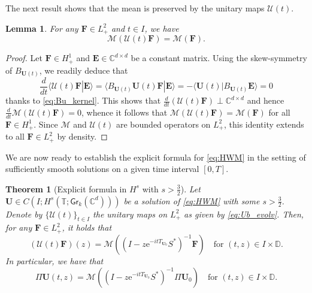 \documentclass[10pt,reqno,a4paper]{amsart}
\newtheorem{lem}{Lemma}[section]
\newtheorem{thm}{Theorem}[section]
\theoremstyle{definition}
\theoremstyle{remark}
\theoremstyle{remark}
\numberwithin{equation}{section}
\newcommand{\C}{\mathbb{C}}
\newcommand{\T}{\mathbb{T}}
\newcommand{\D}{\mathbb{D}}
\newcommand{\Mean}{\mathscr{M}}
\newcommand{\Cd}{\mathbb{C}^{d \times d}}
\newcommand{\eu}{\mathrm{e}}
\newcommand{\Ub}{\mathbf{U}}
\newcommand{\Fb}{\mathbf{F}}
\newcommand{\Eb}{\mathbf{E}}
\newcommand{\id}{I}
\newcommand{\Gr}{\mathsf{Gr}}
\newcommand{\Us}{\mathscr{U}}
\begin{document}
The next result shows that the mean is preserved by the unitary maps $\Us(t)$.

\begin{lem} \label{lem:Us_mean}
For any $\Fb \in L^2_+$ and $t \in I$, we have
$$
\Mean(\Us(t) \Fb) = \Mean(\Fb).
$$
\end{lem}

\begin{proof}
Let $\Fb \in H^1_+$ and $\Eb \in \C^{d \times d}$ be a constant matrix. Using the skew-symmetry of $B_{\Ub(t)}$, we readily deduce that 
$$
\frac{d}{dt} \langle \Us(t) \Fb | \Eb \rangle = \langle B_{\Ub(t)} \Ub(t) \Fb | \Eb \rangle = -\langle \Ub(t) | B_{\Ub(t)} \Eb \rangle = 0
$$
thanks to \eqref{eq:Bu_kernel}. This shows that $\frac{d}{dt} ( \Us(t) \Fb) \perp \Cd$ and hence $\frac{d}{dt} \Mean(\Us(t) \Fb)=0$, whence it follows that $\Mean(\Us(t) \Fb) = \Mean(\Fb)$ for all $\Fb \in H^1_+$. Since $\Mean$ and $\Us(t)$ are bounded operators on $L^2_+$, this identity extends to all $\Fb \in L^2_+$ by density.
\end{proof}


We are now ready to establish the explicit formula for \eqref{eq:HWM} in the setting of sufficiently smooth solutions on a given time interval $[0,T]$.

\begin{thm}[Explicit formula in $H^s$ with $s > \frac{3}{2}$] \label{thm:explicit_smooth}
Let $\Ub \in C(I; H^s(\T;\Gr_k(\C^d)))$ be a solution of \eqref{eq:HWM} with some $s > \frac{3}{2}$. Denote by $\{ \Us(t) \}_{t \in I}$ the  unitary maps on $L^2_+$ as given by \eqref{eq:Ub_evolv}. Then, for any $\Fb \in L^2_+$, it holds that
$$
(\Us(t) \Fb)(z) = \Mean \left ((\id- z \eu^{-it T_{\Ub_0}}S^*)^{-1} \Fb \right ) \quad \mbox{for $(t,z) \in I \times \D$}.
$$
In particular, we have that
$$
\Pi \Ub(t,z) = \Mean \left ( (\id - z \eu^{-it T_{\Ub_0}} S^*)^{-1} \Pi \Ub_0 \right ) \quad \mbox{for $(t,z) \in I \times \D$}.
$$
\end{thm}
\end{document}

